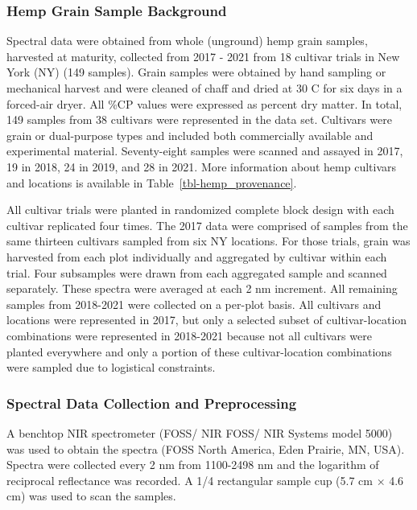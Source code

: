 \documentclass[
]{agujournal2019}
\begin{document}
\subsubsection{Hemp Grain Sample
Background}\label{hemp-grain-sample-background}

Spectral data were obtained from whole (unground) hemp grain samples,
harvested at maturity, collected from 2017 - 2021 from 18 cultivar
trials in New York (NY) (149 samples). Grain samples were obtained by
hand sampling or mechanical harvest and were cleaned of chaff and dried
at 30 C for six days in a forced-air dryer. All \%CP values were
expressed as percent dry matter. In total, 149 samples from 38 cultivars
were represented in the data set. Cultivars were grain or dual-purpose
types and included both commercially available and experimental
material. Seventy-eight samples were scanned and assayed in 2017, 19 in
2018, 24 in 2019, and 28 in 2021. More information about hemp cultivars
and locations is available in Table~\ref{tbl-hemp_provenance}.

All cultivar trials were planted in randomized complete block design
with each cultivar replicated four times. The 2017 data were comprised
of samples from the same thirteen cultivars sampled from six NY
locations. For those trials, grain was harvested from each plot
individually and aggregated by cultivar within each trial. Four
subsamples were drawn from each aggregated sample and scanned
separately. These spectra were averaged at each 2 nm increment. All
remaining samples from 2018-2021 were collected on a per-plot basis. All
cultivars and locations were represented in 2017, but only a selected
subset of cultivar-location combinations were represented in 2018-2021
because not all cultivars were planted everywhere and only a portion of
these cultivar-location combinations were sampled due to logistical
constraints.

\subsubsection{Spectral Data Collection and
Preprocessing}\label{spectral-data-collection-and-preprocessing}

A benchtop NIR spectrometer (FOSS/ NIR FOSS/ NIR Systems model 5000) was
used to obtain the spectra (FOSS North America, Eden Prairie, MN, USA).
Spectra were collected every 2 nm from 1100-2498 nm and the logarithm of
reciprocal reflectance was recorded. A 1/4 rectangular sample cup (5.7
cm × 4.6 cm) was used to scan the samples.
\end{document}

